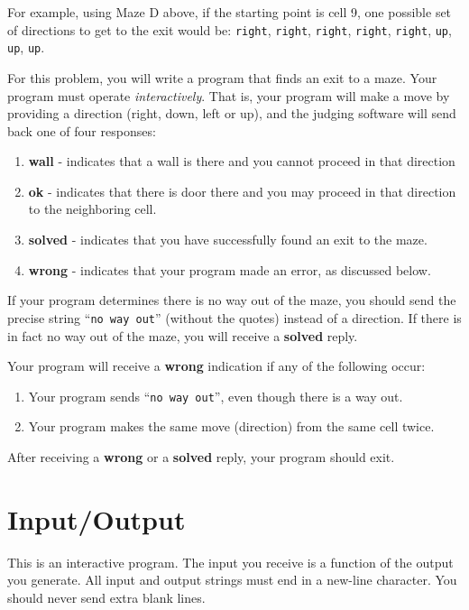 For example, using Maze D above, if the starting point is cell 9, one possible set of directions to get to
the exit would be: \texttt{right}, \texttt{right}, \texttt{right}, \texttt{right}, \texttt{right}, 
\texttt{up}, \texttt{up}, \texttt{up}.

For this problem, you will write a program that finds an exit to a maze. Your program must operate
\emph{interactively}. That is, your program will make a move by providing a direction (right, down, left or up),
and the judging software will send back one of four responses:

\begin{enumerate}
\item \textbf{wall} - indicates that a wall is there and you cannot proceed in that direction
\item \textbf{ok} - indicates that there is door there and you may proceed in that direction to the neighboring cell.
\item \textbf{solved} - indicates that you have successfully found an exit to the maze.
\item \textbf{wrong} - indicates that your program made an error, as discussed below.
\end{enumerate}

If your program determines there is no way out of the maze, you should send the precise string ``\texttt{no way out}'' 
(without the quotes) instead of a direction.
If there is in fact no way out of the maze, you will receive a \textbf{solved} reply.

Your program will receive a \textbf{wrong} indication if any of the following occur:

\begin{enumerate}
\item Your program sends ``\texttt{no way out}'', even though there is a way out.

\item Your program makes the same move (direction) from the same cell twice.
\end{enumerate}

After receiving a \textbf{wrong} or a \textbf{solved} reply, your program should exit.

\section*{Input/Output}

This is an interactive program. The input you receive is a function of the output you generate. All
input and output strings must end in a new-line character. You should never send extra blank lines.

